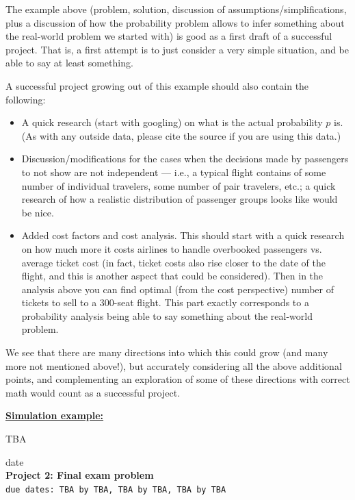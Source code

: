 \documentclass[oneside,11pt]{amsart}
\newcommand{\razdel}[1]{\smallskip\underline{\textbf{#1:}}\smallskip}
\begin{document}
The example above (problem, solution, discussion of assumptions/simplifications,
plus a 
discussion of how the probability 
problem allows to infer something about the 
real-world problem we started with)
is good as a first draft of a successful project.
That is, a first attempt is to just consider a very simple situation,
and be able to say at least something.

A successful project growing out of this example 
should also contain the following:
\begin{itemize}
	\item A quick research (start with googling) on what is the actual probability $p$ is.
	(As with any outside data, please cite the source if you are using this data.)
	\item Discussion/modifications for the cases when the decisions
	made by passengers to not show are not independent --- i.e., 
	a typical flight contains of some number of individual travelers, some number of 
	pair travelers, etc.; a quick research of how a realistic distribution
	of passenger groups looks like would be nice.
	\item Added cost factors and cost analysis. This should start with a quick research
	on how much more it costs airlines to handle overbooked passengers vs. 
	average ticket cost (in fact, ticket costs also rise 
	closer to the date of the flight, and this is another aspect that could be considered). 
	Then in the analysis above you can find optimal (from the cost perspective)
	number of tickets to sell to a 300-seat flight. 
	This part exactly corresponds to a probability analysis being able to 
	say something about the real-world problem.
\end{itemize}
We see that there are many directions
into which this could 
grow (and many more not mentioned above!), but accurately considering all the above additional points, 
and complementing an exploration of 
some of these directions
with correct math would count as a 
successful project.

\razdel{Simulation example}

TBA

\newpage

\begin{center}
	\hfill date
	\\
	{\large\textbf{Project 2: Final exam problem}}
	\\
	\texttt{due dates: TBA by TBA, TBA by TBA, TBA by TBA}
\end{center}
\end{document}
